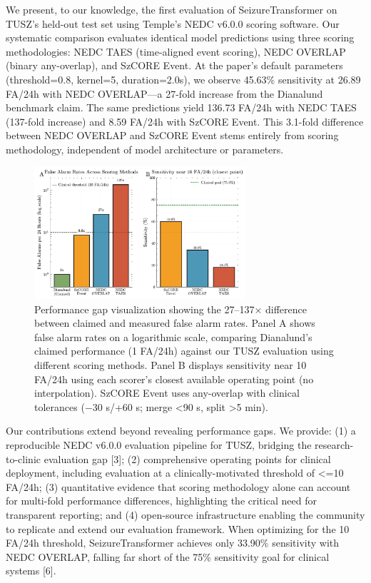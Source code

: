 \documentclass[
]{article}
\begin{document}
We present, to our knowledge, the first evaluation of SeizureTransformer
on TUSZ's held-out test set using Temple's NEDC v6.0.0 scoring software.
Our systematic comparison evaluates identical model predictions using
three scoring methodologies: NEDC TAES (time-aligned event scoring),
NEDC OVERLAP (binary any-overlap), and SzCORE Event. At the paper's
default parameters (threshold=0.8, kernel=5, duration=2.0s), we observe
45.63\% sensitivity at 26.89 FA/24h with NEDC OVERLAP---a 27-fold
increase from the Dianalund benchmark claim. The same predictions yield
136.73 FA/24h with NEDC TAES (137-fold increase) and 8.59 FA/24h with
SzCORE Event. This 3.1-fold difference between NEDC OVERLAP and SzCORE
Event stems entirely from scoring methodology, independent of model
architecture or parameters.

\begin{figure}
\hypertarget{fig:performance-gap}{%
\centering
\includegraphics[width=0.7\textwidth,height=\textheight]{figures/output/arxiv/FIGURE_1_performance_gap.pdf}
\caption{Performance gap visualization showing the 27--137× difference
between claimed and measured false alarm rates. Panel A shows false
alarm rates on a logarithmic scale, comparing Dianalund's claimed
performance (1 FA/24h) against our TUSZ evaluation using different
scoring methods. Panel B displays sensitivity near 10 FA/24h using each
scorer's closest available operating point (no interpolation). SzCORE
Event uses any-overlap with clinical tolerances (−30 s/+60 s; merge
\textless90 s, split \textgreater5 min).}\label{fig:performance-gap}
}
\end{figure}

Our contributions extend beyond revealing performance gaps. We provide:
(1) a reproducible NEDC v6.0.0 evaluation pipeline for TUSZ, bridging
the research-to-clinic evaluation gap {[}3{]}; (2) comprehensive
operating points for clinical deployment, including evaluation at a
clinically-motivated threshold of \textless=10 FA/24h; (3) quantitative
evidence that scoring methodology alone can account for multi-fold
performance differences, highlighting the critical need for transparent
reporting; and (4) open-source infrastructure enabling the community to
replicate and extend our evaluation framework. When optimizing for the
10 FA/24h threshold, SeizureTransformer achieves only 33.90\%
sensitivity with NEDC OVERLAP, falling far short of the 75\% sensitivity
goal for clinical systems {[}6{]}.
\end{document}
